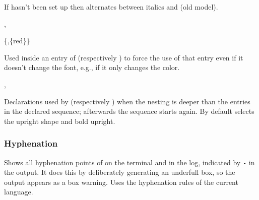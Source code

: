\documentclass{l3in2edoc}
\begin{document}
\begin{variable}
  { \eminnershape }
  If  hasn't been set up
  then  alternates between italics and  (old
  model).
\end{variable}




\begin{function}[user]
  {
    \emforce,
    \strongemforce
  }
  \begin{syntax}
    \{,\{red\}\}
  \end{syntax}
  Used inside an entry of 
  (respectively ) to force the use of
  that entry even if it doesn't change the font, e.g., if it only
  changes the color.
\end{function}




\begin{function}[user]
  {
    \emreset,
    \strongemreset
  }
  \begin{syntax}
  \end{syntax}
  Declarations used by  (respectively ) when
  the nesting is deeper than the entries in the declared sequence;
  afterwards the sequence starts again. By default 
  selects the upright shape and  bold upright.
\end{function}

\subsubsection{Hyphenation}


\begin{function}[user]
  {
    \showhyphens
  }
  \begin{syntax}
     
  \end{syntax}
  Shows all hyphenation points of  on the terminal and in
  the log, indicated by \texttt{-} in the output. It does this by
  deliberately generating an underfull box, so the output appears as a
  box warning. Uses the hyphenation rules of the current language.
\end{function}





\end{document}
